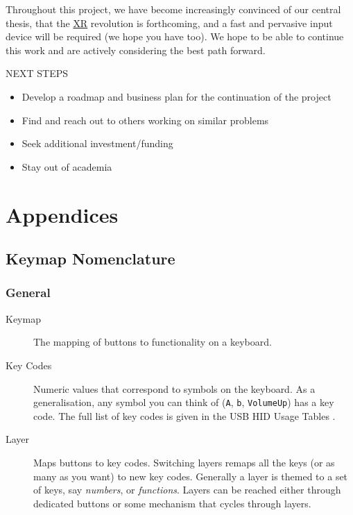\documentclass[logo,bsc,singlespacing,parskip]{infthesis}
\begin{document}
Throughout this project, we have become increasingly convinced of our central thesis, that the \hyperref[org39cbd51]{XR} revolution is forthcoming, and a fast and pervasive input device will be required (we hope you have too).
We hope to be able to continue this work and are actively considering the best path forward.

\begin{mdframed}
\begin{description}
\item[{NEXT STEPS}] 
\end{description}


\begin{itemize}
\item[{$\square$}] Develop a roadmap and business plan for the continuation of the project
\item[{$\square$}] Find and reach out to others working on similar problems
\item[{$\square$}] Seek additional investment/funding
\item[{$\square$}] Stay out of academia
\end{itemize}
\end{mdframed}

\printbibliography
{}
\part{Appendices}
\label{sec:org7d6c265}
\appendix
\chapter{Keymap Nomenclature}
\label{sec:org807f536}
\section{General}
\label{sec:org17043cc}
\begin{mdframed}
\begin{description}
\item[{Keymap}] The mapping of buttons to functionality on a keyboard.
\item[{Key Codes}] Numeric values that correspond to symbols on the keyboard.
As a generalisation, any symbol you can think of (\texttt{A}, \texttt{b}, \texttt{VolumeUp}) has a key code.
The full list of key codes is given in the USB HID Usage Tables \autocite{mcgowanUniversalSerialBus2004}.
\item[{Layer}] Maps buttons to key codes.
Switching layers remaps all the keys (or as many as you want) to new key codes.
Generally a layer is themed to a set of keys, say \emph{numbers}, or \emph{functions}.
Layers can be reached either through dedicated buttons or some mechanism that cycles through layers.
\end{description}
\end{mdframed}
\end{document}
